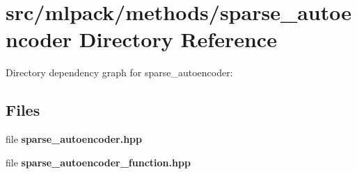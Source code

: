 \section{src/mlpack/methods/sparse\-\_\-autoencoder Directory Reference}
\label{dir_bc44430c1887131140de0b1488219194}
Directory dependency graph for sparse\-\_\-autoencoder\-:
\subsection*{Files}
\begin{DoxyCompactItemize}
\item 
file {\bf sparse\-\_\-autoencoder.\-hpp}
\item 
file {\bf sparse\-\_\-autoencoder\-\_\-function.\-hpp}
\end{DoxyCompactItemize}
